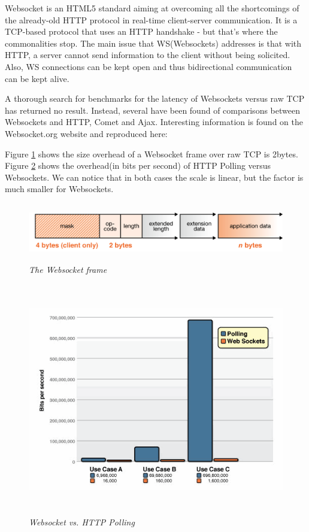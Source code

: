 \documentclass{article}
\begin{document}
Websocket is an HTML5 standard aiming at overcoming all the shortcomings of the
already-old HTTP protocol in real-time client-server communication. It is a
TCP-based protocol that uses an HTTP handshake - but that's where the
commonalities stop. The main issue that WS(Websockets) addresses is that with
HTTP, a server cannot send information to the client without being solicited.
Also, WS connections can be kept open and thus bidirectional communication can
be kept alive.\newline

A thorough search for benchmarks for the latency of Websockets versus raw TCP
has returned no result. Instead, several have been found of comparisons between
Websockets and HTTP, Comet and Ajax. Interesting information is found on the
Websocket.org website and reproduced here: \newline

Figure \ref{fig:websocket_frame} shows the size overhead of a Websocket frame
over raw TCP is 2bytes. Figure \ref{fig:websocket_ws_vs_polling} shows the
overhead(in bits per second) of HTTP Polling versus Websockets. We can notice
that in both cases the scale is linear, but the factor is much smaller for
Websockets.\newline

\begin{figure}
\includegraphics[height=1in,width=7.12in]{./images/websockets/WebSocketFrame.png}  
\caption{\small \sl The Websocket frame \label{fig:websocket_frame}}
\end{figure}

\begin{figure}
\includegraphics[height=4in,width=7.12in]{./images/websockets/poll-ws-compare.png}  
\caption{\small \sl Websocket vs. HTTP Polling
\label{fig:websocket_ws_vs_polling}}
\end{figure}
\end{document}
